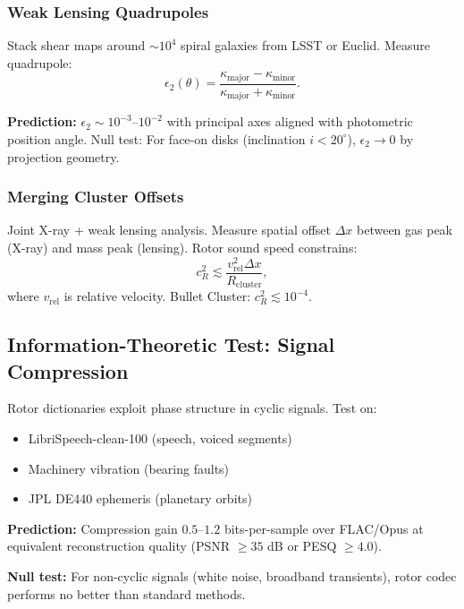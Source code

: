 \documentclass[11pt,a4paper]{article}
\numberwithin{equation}{section}
\theoremstyle{plain}
\theoremstyle{definition}
\theoremstyle{remark}
\begin{document}
\subsubsection{Weak Lensing Quadrupoles}

Stack shear maps around $\sim 10^4$ spiral galaxies from LSST or Euclid. Measure quadrupole:
\begin{equation}
\epsilon_2(\theta) = \frac{\kappa_{\mathrm{major}} - \kappa_{\mathrm{minor}}}{\kappa_{\mathrm{major}} + \kappa_{\mathrm{minor}}}.
\end{equation}

\textbf{Prediction:} $\epsilon_2 \sim 10^{-3}$–$10^{-2}$ with principal axes aligned with photometric position angle. Null test: For face-on disks (inclination $i < 20^\circ$), $\epsilon_2 \to 0$ by projection geometry.

\subsubsection{Merging Cluster Offsets}

Joint X-ray + weak lensing analysis. Measure spatial offset $\Delta x$ between gas peak (X-ray) and mass peak (lensing). Rotor sound speed constrains:
\begin{equation}
c_R^2 \lesssim \frac{v_{\mathrm{rel}}^2 \Delta x}{R_{\mathrm{cluster}}},
\end{equation}
where $v_{\mathrm{rel}}$ is relative velocity. Bullet Cluster: $c_R^2 \lesssim 10^{-4}$.

\subsection{Information-Theoretic Test: Signal Compression}

Rotor dictionaries exploit phase structure in cyclic signals. Test on:
\begin{itemize}
\item LibriSpeech-clean-100 (speech, voiced segments)
\item Machinery vibration (bearing faults)
\item JPL DE440 ephemeris (planetary orbits)
\end{itemize}

\textbf{Prediction:} Compression gain $0.5$–$1.2$ bits-per-sample over FLAC/Opus at equivalent reconstruction quality (PSNR $\geq 35$ dB or PESQ $\geq 4.0$).

\textbf{Null test:} For non-cyclic signals (white noise, broadband transients), rotor codec performs no better than standard methods.
\end{document}
